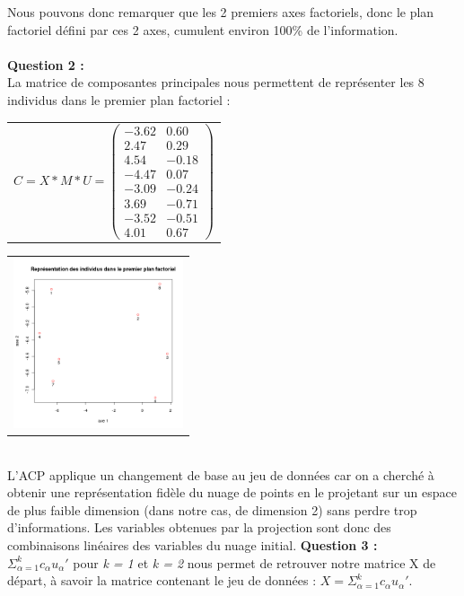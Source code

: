 \documentclass[a4paper, 10pt]{article}
\begin{document}
Nous pouvons donc remarquer que les 2 premiers axes factoriels, donc le plan factoriel défini par ces 2 axes,
cumulent environ 100\% de l'information.\\ \\
\textbf{Question 2 :}\\
La matrice de composantes principales nous permettent de représenter les 8 individus dans le premier plan factoriel :\\
\hspace*{0.5cm}
\begin{tabular}{c}
$C = X * M * U =
\begin{pmatrix}
-3.62 & 0.60 \\
2.47 & 0.29 \\
4.54 & -0.18 \\
-4.47 & 0.07 \\
-3.09 & -0.24 \\
3.69 & -0.71 \\
-3.52 & -0.51 \\
4.01 & 0.67
\end{pmatrix}$\\
\end{tabular}
\hspace*{1cm}
\begin{tabular}{c}
\includegraphics[height = 5cm, width = 5cm]{plots/biplot_exo1_princomp.png}\\
\end{tabular}\\
L'ACP applique un changement de base au jeu de données car on a cherché à obtenir une représentation fidèle du nuage de points en
le projetant sur un espace de plus faible dimension (dans notre cas, de dimension 2) sans perdre trop d'informations.
Les variables obtenues par la projection sont donc des combinaisons linéaires des variables du nuage initial.
\newpage
\noindent
\textbf{Question 3 :}\\
$\varSigma^{k}_{\alpha=1} c_{\alpha}u_{\alpha}'$ pour \textit{k = 1} et \textit{k = 2} nous permet de retrouver notre matrice X de départ,
à savoir la matrice contenant le jeu de données : $X = \varSigma^{k}_{\alpha=1} c_{\alpha}u_{\alpha}'$.
\end{document}
